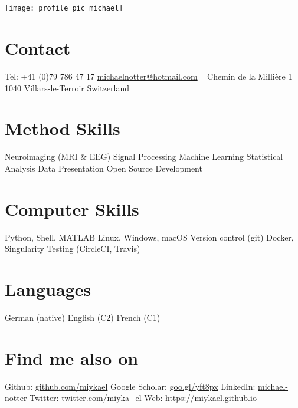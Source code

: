 \documentclass[english]{cv-style}
\begin{document}
\lastupdated

\begin{aside}
\section{~}
\texttt{[image: profile\_pic\_michael]}
%
\section{Contact}
Tel: +41 (0)79 786 47 17
\href{mailto:michaelnotter@hotmail.com}{michaelnotter@hotmail.com}
~
Chemin de la Millière 1
1040 Villars-le-Terroir
Switzerland
%
~
\section{Method Skills}
Neuroimaging (MRI \& EEG)
Signal Processing
Machine Learning
Statistical Analysis
Data Presentation
Open Source Development
%
~
\section{Computer Skills}
Python, Shell, MATLAB
Linux, Windows, macOS
Version control (git)
Docker, Singularity
Testing (CircleCI, Travis)
%
~
\section{Languages }
German (native)
English (C2)
French (C1)
%
~
\section{Find me also on}
Github: \href{https://github.com/miykael}{github.com/miykael}
Google Scholar: \href{https://scholar.google.com/citations?user=cXB2flkAAAAJ&hl=en}{goo.gl/yft8px}
LinkedIn: \href{https://www.linkedin.com/in/michael-notter-5542b464/}{michael-notter}
Twitter: \href{https://twitter.com/miyka_el}{twitter.com/miyka\_el}
Web: \href{https://miykael.github.io}{https://miykael.github.io}
%
\end{aside}

\vspace{0.2cm}
\end{document}
